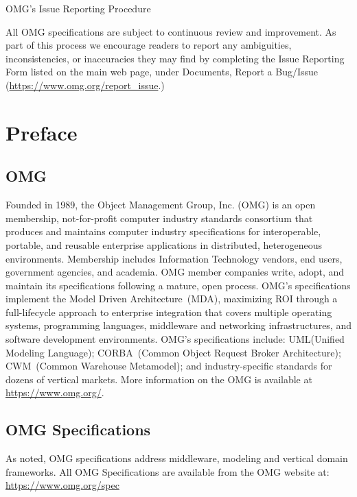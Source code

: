 \begin{center}OMG's Issue Reporting Procedure\end{center}\vspace{-3mm}

All OMG specifications are subject to continuous review and improvement. As part of this process we encourage readers to report any ambiguities, inconsistencies, or inaccuracies they may find by completing the Issue Reporting Form listed on the main web page, under Documents, Report a Bug/Issue ({\url{https://www.omg.org/report\_issue}}.)



\tableofcontents{}
\cleardoublepage

\chapter*{Preface}
\section*{OMG}
Founded in 1989, the Object Management Group, Inc. (OMG) is an open membership, not-for-profit computer industry standards consortium that produces and maintains computer industry specifications for interoperable, portable, and reusable enterprise applications in distributed, heterogeneous environments. Membership includes Information Technology vendors, end users, government agencies, and academia. OMG member companies write, adopt, and maintain its specifications following a mature, open process. OMG's specifications implement the Model Driven Architecture\textregistered\ (MDA\textregistered ), maximizing ROI through a full-lifecycle approach to enterprise integration that covers multiple operating systems, programming languages, middleware and networking infrastructures, and software development environments. OMG's specifications include: UML\textregistered (Unified Modeling Language\texttrademark ); CORBA\textregistered\ (Common Object Request Broker Architecture); CWM\texttrademark\ (Common Warehouse Metamodel); and industry-specific standards for dozens of vertical markets. More information on the OMG is available at \url{https://www.omg.org/}.

\section*{OMG Specifications}
As noted, OMG specifications address middleware, modeling and vertical domain frameworks. All OMG Specifications are available from the OMG website at: \url{https://www.omg.org/spec}

